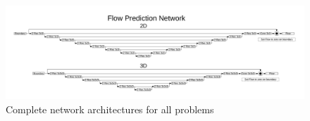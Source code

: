 \documentclass{article} %
\begin{document}
\begin{figure}[h]
\begin{center}
\includegraphics[scale=0.45]{./appendix_flow_net.pdf}
\end{center}
\caption{Complete network architectures for all problems}
\label{network_architectures}
\end{figure}
\end{document}
